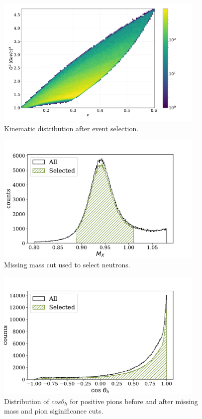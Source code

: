 \begin{figure}
  \begin{center}
    \includegraphics[width=10cm]{image/x_q2.pdf}
    \caption{Kinematic distribution after event selection.}
  \end{center}
\end{figure}

\begin{figure}
  \begin{center}
    \includegraphics[width=10cm]{image/missing_mass.pdf}
    \caption{Missing mass cut used to select neutrons.}
  \end{center}
\end{figure}

\begin{figure}
  \begin{center}
    \includegraphics[width=10cm]{image/cos_theta_h.pdf}
    \caption{Distribution of $cos \theta_h$ for positive pions before and after missing mass and pion siginificance cuts.}
  \end{center}
\end{figure}


